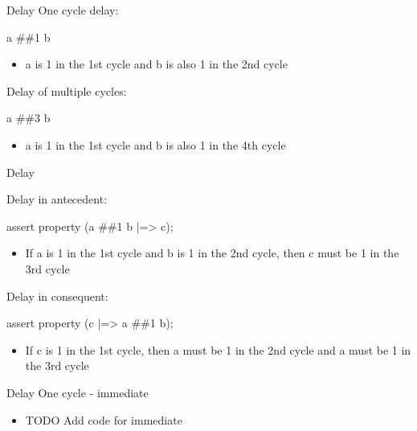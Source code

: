 \documentclass{beamer}
\begin{document}
\begin{frame}{Delay}
One cycle delay:

\begin{semiverbatim}
a \#\#1 b
\end{semiverbatim}

\begin{itemize}
 \item a is 1 in the 1st cycle and b is also 1 in the 2nd cycle
\end{itemize}

\pause
Delay of multiple cycles:

\begin{semiverbatim}
a \#\#3 b
\end{semiverbatim}

\begin{itemize}
 \item a is 1 in the 1st cycle and b is also 1 in the 4th cycle
\end{itemize}
\end{frame}


\begin{frame}{Delay}

Delay in antecedent:
\begin{semiverbatim}
assert property (a \#\#1 b |=> c);
\end{semiverbatim}

\begin{itemize}
 \item If a is 1 in the 1st cycle and b is 1 in the 2nd cycle, then c must be 1 in the 3rd cycle
\end{itemize}

\pause

Delay in consequent:
\begin{semiverbatim}
assert property (c |=> a \#\#1 b);
\end{semiverbatim}

\begin{itemize}
 \item If c is 1 in the 1st cycle, then a must be 1 in the 2nd cycle and a must be 1 in the 3rd cycle
\end{itemize}

\end{frame}


\begin{frame}{Delay}
One cycle - immediate

\begin{itemize}
 \item TODO Add code for immediate
\end{itemize}
\end{frame}
\end{document}
